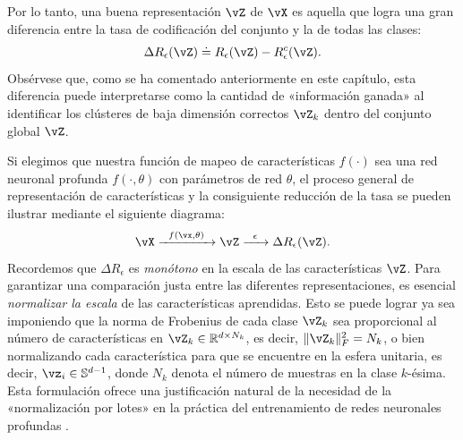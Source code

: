 \documentclass[../../book-main.tex]{subfiles}
\begin{document}
Por lo tanto, una buena representación $\vZ$ de $\vX$ es aquella que
logra una gran diferencia entre la tasa de codificación del conjunto y
la de todas las clases:
\begin{equation}
    \Delta R_{\epsilon}(\vZ) \doteq R_{\epsilon}(\vZ) - R_{\epsilon}^c(\vZ).
    \label{chap4-eqn:coding-length-reduction}
\end{equation}
Obsérvese que, como se ha comentado anteriormente en este capítulo, esta
diferencia puede interpretarse como la cantidad de «información ganada»
al identificar los clústeres de baja dimensión correctos $\vZ_k$ dentro del
conjunto global $\vZ$.

Si elegimos que nuestra función de mapeo de características $f(\cdot)$ sea una red neuronal profunda
$f(\cdot,\theta)$ con parámetros de red $\theta$, el
proceso general de representación de características y la consiguiente reducción de la tasa
se pueden ilustrar mediante el siguiente diagrama:
\begin{equation}
    \vX
    \xrightarrow{\hspace{2mm} f(\vx, \theta)\hspace{2mm}} \vZ
    \xrightarrow{\hspace{2mm} \epsilon \hspace{2mm}} \Delta
    R_{\epsilon}(\vZ).
    \label{chap4-eqn:flow}
\end{equation}
Recordemos que $\Delta R_{\epsilon}$ es {\em monótono} en la escala de
las características $\vZ$. Para garantizar una comparación justa entre las diferentes
representaciones, es esencial {\em normalizar la escala} de las
características aprendidas. Esto se puede lograr ya sea imponiendo que la
norma de Frobenius de cada clase $\vZ_k$ sea proporcional al número de
características en $\vZ_k \in \mathbb R^{d \times N_k}$, es decir, $\|\vZ_k\|_F^2
= N_k$, o bien normalizando cada característica para que se encuentre en la esfera unitaria,
es decir, $\vz_i \in \mathbb{S}^{d-1}$, donde $N_k$
denota el número de muestras en la clase $k$-ésima. Esta formulación
ofrece una justificación natural de la necesidad de la «normalización por lotes»
en la práctica del
entrenamiento de redes neuronales profundas \cite{ioffe2015batch}. %
\end{document}

